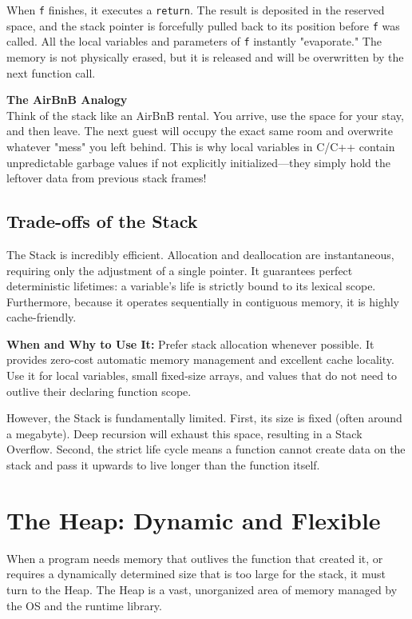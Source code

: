 When \texttt{f} finishes, it executes a \texttt{return}. The result is deposited in the reserved space, and the stack pointer is forcefully pulled back to its position before \texttt{f} was called. All the local variables and parameters of \texttt{f} instantly "evaporate." The memory is not physically erased, but it is released and will be overwritten by the next function call. 

\begin{notebox}
\textbf{The AirBnB Analogy} \\
Think of the stack like an AirBnB rental. You arrive, use the space for your stay, and then leave. The next guest will occupy the exact same room and overwrite whatever "mess" you left behind. This is why local variables in C/C++ contain unpredictable garbage values if not explicitly initialized—they simply hold the leftover data from previous stack frames!
\end{notebox}

\subsection{Trade-offs of the Stack}
The Stack is incredibly efficient. Allocation and deallocation are instantaneous, requiring only the adjustment of a single pointer. It guarantees perfect deterministic lifetimes: a variable's life is strictly bound to its lexical scope. Furthermore, because it operates sequentially in contiguous memory, it is highly cache-friendly.

\textbf{When and Why to Use It:} Prefer stack allocation whenever possible. It provides zero-cost automatic memory management and excellent cache locality. Use it for local variables, small fixed-size arrays, and values that do not need to outlive their declaring function scope.

However, the Stack is fundamentally limited. First, its size is fixed (often around a megabyte). Deep recursion will exhaust this space, resulting in a Stack Overflow. Second, the strict life cycle means a function cannot create data on the stack and pass it upwards to live longer than the function itself. 

\section{The Heap: Dynamic and Flexible}

When a program needs memory that outlives the function that created it, or requires a dynamically determined size that is too large for the stack, it must turn to the Heap. The Heap is a vast, unorganized area of memory managed by the OS and the runtime library. 

